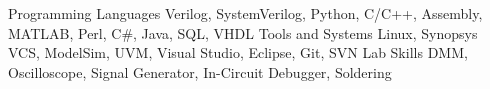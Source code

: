 
\begin{cvskills}

  \cvskill
    {Programming Languages} %
    {Verilog, SystemVerilog, Python, C/C++, Assembly, MATLAB, Perl, C\#, Java, SQL, VHDL} %
  \cvskill
    {Tools and Systems} %
    {Linux, Synopsys VCS, ModelSim, UVM, Visual Studio, Eclipse, Git, SVN} %
  \cvskill
    {Lab Skills} %
    {DMM, Oscilloscope, Signal Generator, In-Circuit Debugger, Soldering} %
    
\end{cvskills}
